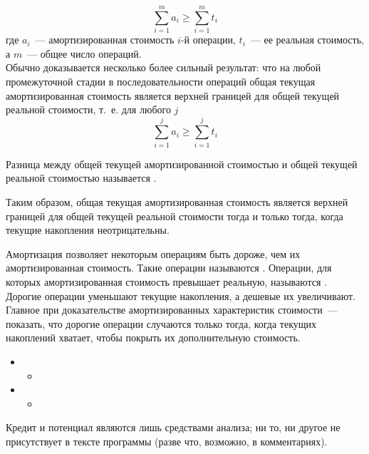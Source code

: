 \begin{frame}[fragile]{}
$$
\sum_{i=1}^m a_i \ge \sum_{i=1}^m t_i
$$
где $a_i$~--- амортизированная стоимость $i$-й операции, $t_i$~--- ее
реальная стоимость, а $m$~--- общее число операций.\\

 Обычно
доказывается несколько более сильный результат: что на любой
промежуточной стадии в последовательности операций общая текущая
амортизированная стоимость является верхней границей для общей текущей
реальной стоимости, т.~е. для любого $j$
$$
\sum_{i=1}^j a_i \ge \sum_{i=1}^j t_i
$$
\end{frame}


\begin{frame}[fragile]{}
\begin{definition}
Разница между общей текущей амортизированной стоимостью
и общей текущей реальной стоимостью называется
. 
\end{definition}
Таким образом, общая
текущая амортизированная стоимость является верхней границей для
общей текущей реальной стоимости тогда и только тогда, когда текущие
накопления неотрицательны.

\end{frame}


\begin{frame}[fragile]{}
Амортизация позволяет некоторым операциям быть дороже, чем их
амортизированная стоимость. Такие операции называются
. Операции, для которых амортизированная
стоимость превышает реальную, называются
. Дорогие операции уменьшают текущие накопления,
а дешевые их увеличивают.\\

 Главное при доказательстве
амортизированных характеристик стоимости~--- показать, что дорогие
операции случаются только тогда, когда текущих накоплений хватает,
чтобы покрыть их дополнительную стоимость.
\end{frame}



\begin{frame}[fragile]{}
\begin{itemize}
  \item {} 
      \begin{itemize}
        \item {}
      \end{itemize}
  \item {}
      \begin{itemize}
        \item {}
      \end{itemize}
\end{itemize}



Кредит и потенциал являются лишь средствами анализа; ни
то, ни другое не присутствует в тексте программы (разве что, возможно,
в комментариях).

\end{frame}

